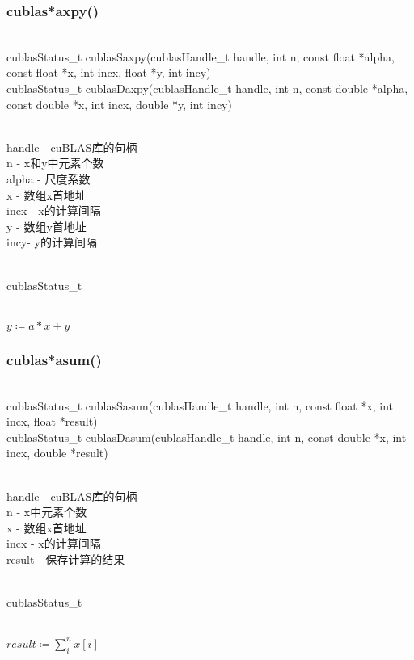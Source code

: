 \subsubsection{cublas*axpy()}
\begin{cnfrmfunc}
   \item{}\\ 
     cublasStatus\_t cublasSaxpy(cublasHandle\_t handle, int n,
                           const float           *alpha,
                           const float           *x, int incx,
                           float                 *y, int incy)\\
     cublasStatus\_t cublasDaxpy(cublasHandle\_t handle, int n,
                           const double          *alpha,
                           const double          *x, int incx,
                           double                *y, int incy)
   \item{}\\
     handle - cuBLAS库的句柄\\                      
     n - x和y中元素个数\\
     alpha - 尺度系数\\
     x - 数组x首地址\\
     incx - x的计算间隔\\
     y - 数组y首地址\\
     incy- y的计算间隔
   \item{}\\
     cublasStatus\_t
   \item{}\\
     $y\coloneqq a*x+y$
\end{cnfrmfunc}
\subsubsection{cublas*asum()}
\begin{cnfrmfunc}
   \item{}\\ 
     cublasStatus\_t  cublasSasum(cublasHandle\_t handle, int n,
                                 const float *x, int incx, float  *result)\\
     cublasStatus\_t  cublasDasum(cublasHandle\_t handle, int n,
                                 const double *x, int incx, double *result)
   \item{}\\
     handle - cuBLAS库的句柄\\                      
     n - x中元素个数\\
     x - 数组x首地址\\
     incx - x的计算间隔\\
     result - 保存计算的结果
   \item{}\\
     cublasStatus\_t
   \item{}\\
     $result\coloneqq \sum\limits_{i}^{n}x[i]$
\end{cnfrmfunc}
